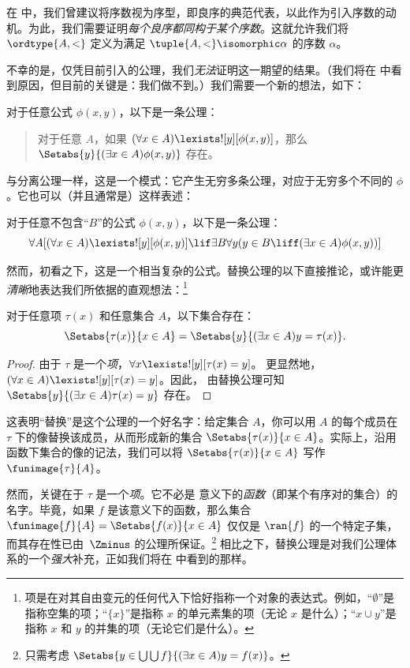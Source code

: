 \documentclass[../../../include/open-logic-section]{subfiles}
\begin{document}

在  中，我们曾建议将序数视为序型，即良序的典范代表，以此作为引入序数的动机。为此，我们需要证明\emph{每个良序都同构于某个序数}。这就允许我们将 $\ordtype{A, <}$ 定义为满足 $\tuple{A, <} \isomorphic \alpha$ 的序数 $\alpha$。

不幸的是，仅凭目前引入的公理，我们\emph{无法}证明这一期望的结果。（我们将在  中看到原因，但目前的关键是：我们做不到。）我们需要一个新的想法，如下：

\begin{axiom}[替换公理模式]
对于任意公式 $\phi(x, y)$，以下是一条公理：
\begin{quote}
	对于任意 $A$，如果 $(\forall x \in A)\lexists![y][\phi(x,y)]$，那么
	$\Setabs{y}{(\exists x \in A)\phi(x,y)}$ 存在。
\end{quote}
\end{axiom}

\noindent
与分离公理一样，这是一个模式：它产生无穷多条公理，对应于无穷多个不同的 $\phi$。它也可以（并且通常是）这样表述：

\begin{defish}
对于任意不包含“$B$”的公式 $\phi(x,y)$，以下是一条公理：
\[
\forall A[(\forall x \in A)\lexists![y][\phi(x,y)] \lif \exists B\forall y (y \in B \liff (\exists x \in A)\phi(x,y))]
\]
\end{defish}

然而，初看之下，这是一个相当复杂的公式。替换公理的以下直接推论，或许能更\emph{清晰}地表达我们所依据的直观想法：\footnote{项是在对其自由变元的任何代入下恰好指称一个对象的表达式。例如，“$\emptyset$”是指称空集的项；“$\{x\}$”是指称 $x$ 的单元素集的项（无论 $x$ 是什么）；“$x \cup y$”是指称 $x$ 和 $y$ 的并集的项（无论它们是什么）。}

\begin{cor}
对于任意项 $\tau(x)$ 和任意集合 $A$，以下集合存在：
\[
	\Setabs{\tau(x)}{x \in A} = \Setabs{y}{(\exists x \in A)y = \tau(x)}.
\]
\end{cor}

\begin{proof}
由于 $\tau$ 是一个\emph{项}，$\forall x \lexists![y][\tau(x) = y]$。
更显然地，$(\forall x \in A)\lexists![y][\tau(x) = y]$。因此，
由替换公理可知 $\Setabs{y}{(\exists x \in A)\tau(x) = y}$ 存在。
\end{proof}

\noindent
这表明“替换”是这个公理的一个好名字：给定集合 $A$，你可以用 $A$ 的每个成员在~$\tau$ 下的像替换该成员，从而形成新的集合 $\Setabs{\tau(x)}{x \in A}$。实际上，沿用函数下集合的像的记法，我们可以将 $\Setabs{\tau(x)}{x \in A}$ 写作 $\funimage{\tau}{A}$。

然而，关键在于 $\tau$ 是一个\emph{项}。它不必是  意义下的\emph{函数}（即某个有序对的集合）的名字。毕竟，如果 $f$ 是该意义下的函数，那么集合 $\funimage{f}{A} = \Setabs{f(x)}{x \in
A}$ 仅仅是 $\ran{f}$ 的一个特定子集，而其存在性已由~$\Zminus$ 的公理所保证。\footnote{只需考虑 $\Setabs{y \in \bigcup \bigcup f}{(\exists x \in A)y =
f(x)}$。} 相比之下，替换公理是对我们公理体系的一个\emph{强大}补充，正如我们将在  中看到的那样。
\end{document}
